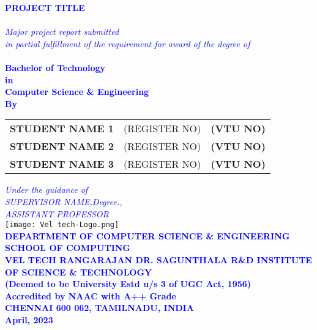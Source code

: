 \documentclass[10pt]{report}
\begin{document}
\newpage
\begin{center}
\thispagestyle{empty}
\LARGE{\textsc {\textbf{\textcolor{blue}{PROJECT TITLE}}}}\\[0.2cm]
\vspace{0.2cm}
\Large{\textit{\textcolor{blue}{\\Major project report submitted \\in partial fulfillment of the
requirement
for award of the degree of}}}\\[0.3cm]
\Large{\textbf{\textcolor{blue}{\\Bachelor of Technology\\in \\Computer Science \& Engineering}}}
\vspace{0.5cm}
\Large{\textbf{\textcolor{blue}{\\By}}}\\[0.5cm]
\begin{table}[h]
\centering
\Large{\textcolor{blue}{
\begin{tabular}{>{\bfseries}lc>{\bfseries}r}
STUDENT NAME 1&(REGISTER NO) & (VTU NO)\\STUDENT NAME 2 & (REGISTER NO)&(VTU NO)\\STUDENT NAME 3&(REGISTER NO) & (VTU NO)\\
\end{tabular}}}
\end{table}
\vspace{0.5cm}
\large{\textit{\textcolor{blue}{Under the guidance of}}}\\
\large{\textit{\textcolor{blue}{SUPERVISOR NAME,Degree.,\\
ASSISTANT PROFESSOR}
}}\\
\vspace{0.5cm}
\texttt{[image: Vel tech-Logo.png]}\\
\vspace{1cm}
\large{\textbf{\textcolor{blue}{DEPARTMENT OF COMPUTER SCIENCE \& ENGINEERING}}}\\

\large{\textbf{\textcolor{blue}{SCHOOL OF COMPUTING}}}\\
\vspace{0.5cm}
\Large{\textbf{\textcolor{blue}{VEL TECH RANGARAJAN DR. SAGUNTHALA R\&D INSTITUTE OF
SCIENCE \& TECHNOLOGY\\
\vspace{0.2cm}
(Deemed to be University Estd u/s 3 of UGC Act,
1956)}}}\\\Large{\textbf{\textcolor{blue}{Accredited by NAAC with A++ Grade}}}\\
\large{\textbf{\textcolor{blue}{CHENNAI 600 062, TAMILNADU, INDIA}}}
\vspace{0.4cm}
\large{\textbf{\textcolor{blue}{\\April, 2023}}}\\
\end{center}
\end{document}
